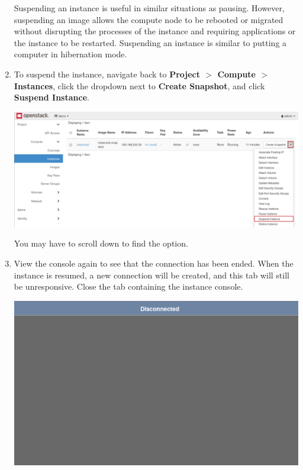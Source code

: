 \documentclass[letterpaper, 12pt]{article}
\begin{document}
\begin{enumerate}
    \begin{tipbox}
        Suspending an instance is useful in similar situations as pausing.
        However, suspending an image allows the compute node to be rebooted or migrated without disrupting the processes of the instance and requiring applications or the instance to be restarted.
        Suspending an instance is similar to putting a computer in hibernation mode.
    \end{tipbox}

    \item To suspend the instance, navigate back to \textbf{Project $>$ Compute $>$ Instances}, click the dropdown next to \textbf{Create Snapshot}, and click \textbf{Suspend Instance}.

    \begin{center}
        \includegraphics[width=\linewidth]{images/part3/step8.png}
    \end{center}

    \begin{notebox}
        You may have to scroll down to find the option.
    \end{notebox}

    \item View the console again to see that the connection has been ended.
    When the instance is resumed, a new connection will be created, and this tab will still be unresponsive.
    Close the tab containing the instance console.

    \begin{center}
        \includegraphics[width=\linewidth]{images/part3/step9.png}
    \end{center}


\end{enumerate}
\end{document}
